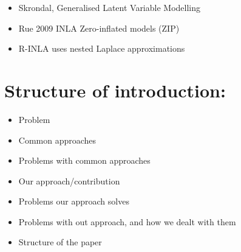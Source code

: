 \documentclass{article}
\begin{document}
\begin{itemize}
\item Skrondal, Generalised Latent Variable Modelling
\item Rue 2009 INLA Zero-inflated models (ZIP)
\item R-INLA uses nested Laplace approximations
\end{itemize}

\section{Structure of introduction:}
\begin{itemize}
\item Problem
\item Common approaches
\item Problems with common approaches
\item Our approach/contribution
\item Problems our approach solves
\item Problems with out approach, and how we dealt with them
\item Structure of the paper
\end{itemize}
\end{document}
